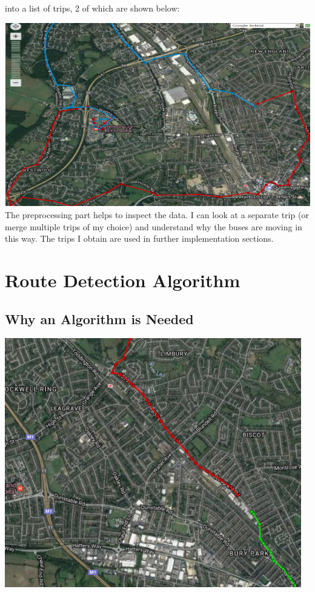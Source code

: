 \documentclass[12pt,a4paper,oneside,openright]{report}
\begin{document}
into a list of trips, 2 of which are shown below:

\includegraphics[width=\textwidth]{figs/processed.png} \\

The preprocessing part helps to inspect the data. I can look at a separate trip (or merge 
multiple trips of my choice) and understand why the buses are moving in this way.
The trips I obtain are used in further implementation sections.

\section{Route Detection Algorithm}

\subsection{Why an Algorithm is Needed}

\includegraphics[scale=0.8]{figs/route_detector.png} \\
\end{document}
